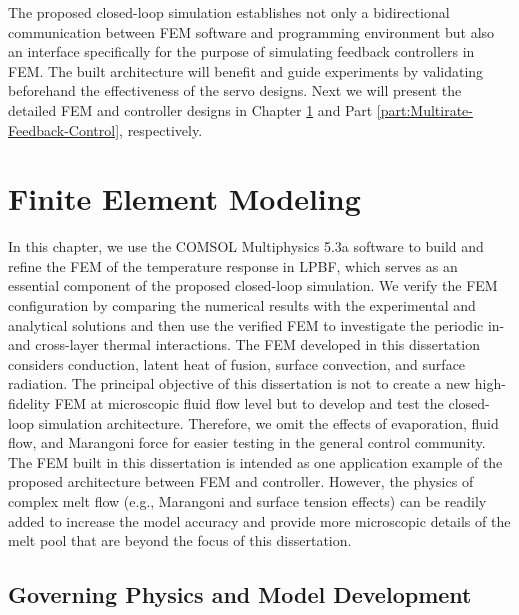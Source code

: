 \documentclass [11pt, proquest] {uwthesis}[2020/02/24]
\begin{document}
The proposed closed-loop simulation establishes not only a bidirectional
communication between FEM software and programming environment but
also an interface specifically for the purpose of simulating feedback
controllers in FEM. The built architecture will benefit and guide
experiments by validating beforehand the effectiveness of the servo
designs. Next we will present the detailed FEM and controller designs
in Chapter \ref{chap:FEM} and Part \ref{part:Multirate-Feedback-Control},
respectively.


\chapter{Finite Element Modeling} \label{chap:FEM}

In this chapter, we use the COMSOL Multiphysics 5.3a software to build
and refine the FEM of the temperature response in LPBF, which serves
as an essential component of the proposed closed-loop simulation.
We verify the FEM configuration by comparing the numerical results
with the experimental and analytical solutions and then use the verified FEM to investigate
the periodic in- and cross-layer thermal interactions. The FEM developed
in this dissertation considers conduction, latent heat of fusion, surface
convection, and surface radiation. The principal objective of this dissertation is not to create a new high-fidelity FEM at microscopic fluid
flow level but to develop and test the closed-loop simulation architecture.
Therefore, we omit the effects of evaporation, fluid flow, and Marangoni
force for easier testing in the general control community. The FEM
built in this dissertation is intended as one application example of the
proposed architecture between FEM and controller. However, the physics
of complex melt flow (e.g., Marangoni and surface tension effects)
can be readily added to increase the model accuracy and provide more
microscopic details of the melt pool that are beyond the focus of
this dissertation.

\section{Governing Physics and Model Development} \label{sec:FEM}
\end{document}
